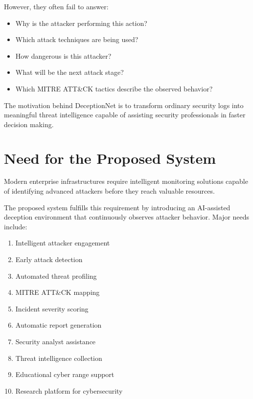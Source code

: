 \documentclass[12pt,a4paper]{report}
\begin{document}
However, they often fail to answer:

\begin{itemize}
\item Why is the attacker performing this action?
\item Which attack techniques are being used?
\item How dangerous is this attacker?
\item What will be the next attack stage?
\item Which MITRE ATT\&CK tactics describe the observed behavior?
\end{itemize}

The motivation behind DeceptionNet is to transform ordinary security logs into meaningful threat intelligence capable of assisting security professionals in faster decision making.


\section{Need for the Proposed System}

Modern enterprise infrastructures require intelligent monitoring solutions capable of identifying advanced attackers before they reach valuable resources.

The proposed system fulfills this requirement by introducing an AI-assisted deception environment that continuously observes attacker behavior. Major needs include:

\begin{enumerate}
\item Intelligent attacker engagement
\item Early attack detection
\item Automated threat profiling
\item MITRE ATT\&CK mapping
\item Incident severity scoring
\item Automatic report generation
\item Security analyst assistance
\item Threat intelligence collection
\item Educational cyber range support
\item Research platform for cybersecurity
\end{enumerate}

\end{document}
